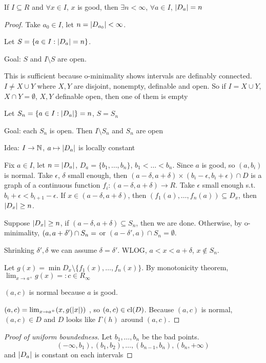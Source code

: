 \documentclass[11pt]{article}
\begin{document}
\begin{lemma}[]
If \(I\subseteq R\) and \(\forall x\in I\), \(x\) is good, then \(\exists n<\infty\), \(\forall a\in I\), \(\abs{D_a}=n\)
\end{lemma}

\begin{proof}
Take \(a_0\in I\), let \(n=\abs{D_{a_0}}<\infty\).

Let \(S=\{a\in I:\abs{D_a}=n\}\).

Goal: \(S\) and \(I\setminus S\) are open.

This is sufficient because o-minimality shows intervals are definably connected. \(I\neq X\cup Y\)
where \(X,Y\) are disjoint, nonempty, definable and open. So if \(I=X\cup Y\), \(X\cap Y=\emptyset\), \(X,Y\)
definable open, then one of them is empty

Let \(S_n=\{a\in I:\abs{D_a}\}=n\), \(S=S_n\)

Goal: each \(S_n\) is open. Then \(I\setminus S_n\) and \(S_n\) are open

Idea: \(I\to\mathbb{N}\), \(a\mapsto\abs{D_a}\) is locally constant

Fix \(a\in I\), let \(n=\abs{D_a}\), \(D_a=\{b_1,\dots,b_n\}\), \(b_1<\dots<b_n\). Since \(a\) is good,
so \((a,b_i)\) is normal. Take \(\epsilon\), \(\delta\) small enough, then \((a-\delta,a+\delta)\times(b_i-\epsilon,b_i+\epsilon)\cap D\) is a graph of
a continuous function \(f_i:(a-\delta,a+\delta)\to R\). Take \(\epsilon\) small enough s.t. \(b_i+\epsilon<b_{i+1}-\epsilon\).
If \(x\in(a-\delta,a+\delta)\), then \((f_1(a),\dots,f_n(a))\subseteq D_x\), then \(\abs{D_x}\ge n\).

Suppose \(\abs{D_x}\ge n\), if \((a-\delta,a+\delta)\subseteq S_n\), then we are done. Otherwise, by
o-minimality, \((a,a+\delta')\cap S_n=\empty\) or \((a-\delta',a)\cap S_n=\emptyset\).

Shrinking \(\delta',\delta\) we can assume \(\delta=\delta'\). WLOG, \(a<x<a+\delta\), \(x\notin S_n\).

Let \(g(x)=\min D_x\setminus\{f_1(x),\dots,f_n(x)\}\). By monotonicity theorem, \(\lim_{x\to a^+}g(x)=:c\in R_\infty\)

\((a,c)\) is normal because \(a\) is good.

\((a,c)=\lim_{x\to a^+}(x,g(\abs{x}))\) , so \((a,c)\in\operatorname{\text{cl}}(D)\). Because \((a,c)\) is
normal, \((a,c)\in D\) and \(D\) looks like \(\Gamma(h)\) around \((a,c)\).
\end{proof}

\begin{proof}[Proof of uniform boundedness]
Let \(b_1,\dots,b_n\) be the bad points.
\begin{equation*}
(-\infty,b_1),(b_1,b_2),\dots,(b_{n-1},b_n),(b_n,+\infty)
\end{equation*}
and \(\abs{D_a}\) is constant on each intervals
\end{proof}
\end{document}
